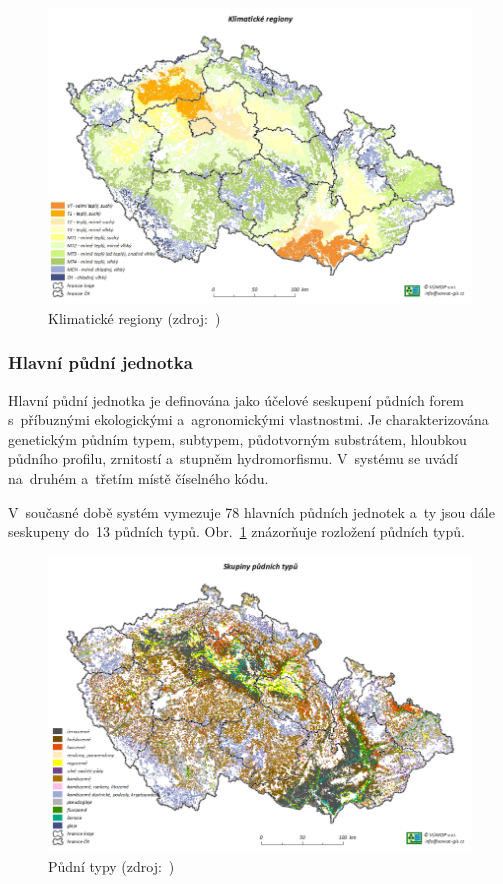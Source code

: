 	\begin{figure}[H]
		\centering
		\includegraphics[width=.9\textwidth]{./pictures/klimaticky_region.png}
		\caption[Klimatické regiony]{Klimatické regiony (zdroj:~\citep{vumop_bpej})}
		\label{fig:klimaticke_regiony}
 	\end{figure}

\subsubsection{Hlavní půdní jednotka}
\label{hpj}

Hlavní půdní jednotka je definována jako účelové seskupení půdních forem s~příbuznými ekologickými a~agronomickými vlastnostmi. Je charakterizována genetickým půdním typem, subtypem, půdotvorným substrátem, hloubkou půdního profilu, zrnitostí a~stupněm hydromorfismu. V~systému  se uvádí na~druhém a~třetím místě číselného kódu.

V~současné době systém  vymezuje 78 hlavních půdních jednotek a~ty jsou dále seskupeny do~13 půdních typů. Obr.~\ref{fig:klimaticke_regiony} znázorňuje rozložení půdních typů.

	\begin{figure}[H]
		\centering
		\includegraphics[width=.9\textwidth]{./pictures/pudni_typy.png}
		\caption[Půdní typy]{Půdní typy (zdroj:~\citep{vumop_bpej})}
		\label{fig:pudni_typy}
 	\end{figure}

